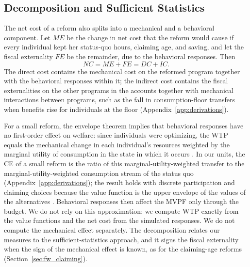 \subsection{Decomposition and Sufficient Statistics}\label{sec:fw_decomp}

The net cost of a reform also splits into a mechanical and a behavioral component. Let $\mathit{ME}$ be the change in net cost that the reform would cause if every individual kept her status-quo hours, claiming age, and saving, and let the fiscal externality $\mathit{FE}$ be the remainder, due to the behavioral responses. Then
\begin{equation}\label{eq:netcost}
\mathit{NC}=\mathit{ME}+\mathit{FE}=\mathit{DC}+\mathit{IC}.
\end{equation}
The direct cost contains the mechanical cost on the reformed program together with the behavioral responses within it; the indirect cost contains the fiscal externalities on the other programs in the accounts together with mechanical interactions between programs, such as the fall in consumption-floor transfers when benefits rise for individuals at the floor (Appendix~\ref{app:derivations}).

For a small reform, the envelope theorem implies that behavioral responses have no first-order effect on welfare: since individuals were optimizing, the WTP equals the mechanical change in each individual's resources weighted by the marginal utility of consumption in the state in which it occurs \citep{hendren2016policy}. In our units, the CE of a small reform is the ratio of this marginal-utility-weighted transfer to the marginal-utility-weighted consumption stream of the status quo (Appendix~\ref{app:derivations}); the result holds with discrete participation and claiming choices because the value function is the upper envelope of the values of the alternatives \citep{milgrom2002envelope}. Behavioral responses then affect the MVPF only through the budget. We do not rely on this approximation: we compute WTP exactly from the value functions and the net cost from the simulated responses. We do not compute the mechanical effect separately. The decomposition relates our measures to the sufficient-statistics approach, and it signs the fiscal externality when the sign of the mechanical effect is known, as for the claiming-age reforms (Section~\ref{sec:fw_claiming}).

